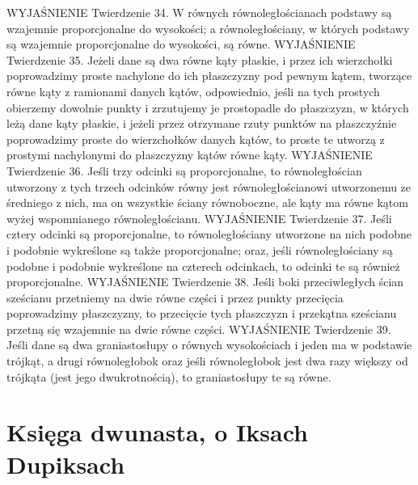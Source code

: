     WYJAŚNIENIE
Twierdzenie 34.
    W równych równoległościanach podstawy są wzajemnie proporcjonalne do wysokości; a równoległościany, w których podstawy są wzajemnie proporcjonalne do wysokości, są równe. 
    WYJAŚNIENIE
Twierdzenie 35.
    Jeżeli dane są dwa równe kąty płaskie, i przez ich wierzchołki poprowadzimy proste nachylone do ich płaszczyzny pod pewnym kątem, tworzące równe kąty z ramionami danych kątów, odpowiednio, jeśli na tych prostych obierzemy dowolnie punkty i zrzutujemy je prostopadle do płaszczyzn, w których leżą dane kąty płaskie, i jeżeli przez otrzymane rzuty punktów na płaszczyźnie poprowadzimy proste do wierzchołków danych kątów, to proste te utworzą z prostymi nachylonymi do płaszczyzny kątów równe kąty.
    WYJAŚNIENIE
Twierdzenie 36.
    Jeśli trzy odcinki są proporcjonalne, to równoległościan utworzony z tych trzech odcinków równy jest równoległościanowi utworzonemu ze średniego z nich, ma on wszystkie ściany równoboczne, ale kąty ma równe kątom wyżej wspomnianego równoległościanu.
    WYJAŚNIENIE
Twierdzenie 37.
    Jeśli cztery odcinki są proporcjonalne, to równoległościany utworzone na nich podobne i podobnie wykreślone są także proporcjonalne; oraz, jeśli równoległościany są podobne i podobnie wykreślone na czterech odcinkach, to odcinki te są również proporcjonalne. 
    WYJAŚNIENIE
Twierdzenie 38.
    Jeśli boki przeciwległych ścian sześcianu przetniemy na dwie równe części i przez punkty przecięcia poprowadzimy płaszczyzny, to przecięcie tych płaszczyzn i przekątna sześcianu przetną się wzajemnie na dwie równe części.
    WYJAŚNIENIE
Twierdzenie 39.
    Jeśli dane są dwa graniastosłupy o równych wysokościach i jeden ma w podstawie trójkąt, a drugi równoległobok oraz jeśli równoległobok jest dwa razy większy od trójkąta (jest jego dwukrotnością), to graniastosłupy te są równe.


\section{Księga dwunasta, o Iksach Dupiksach}

